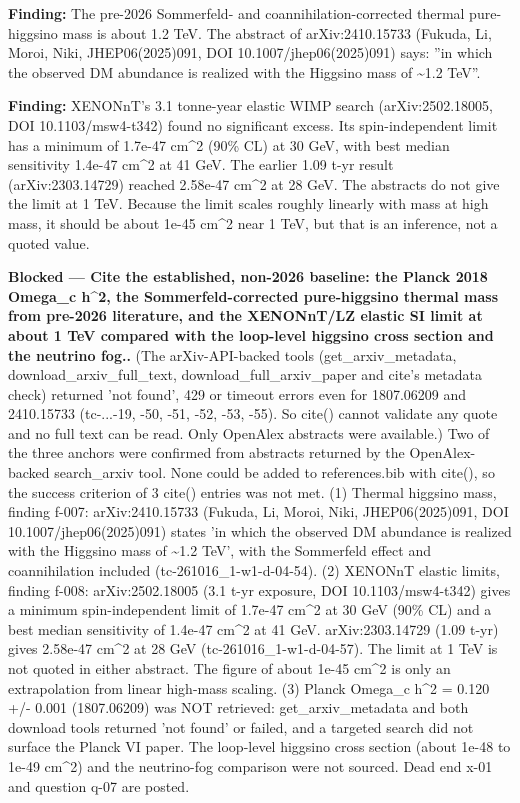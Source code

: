 \documentclass[11pt,a4paper]{article}
\begin{document}
\textbf{Finding:} The pre-2026 Sommerfeld- and coannihilation-corrected thermal pure-higgsino mass is about 1.2 TeV. The abstract of arXiv:2410.15733 (Fukuda, Li, Moroi, Niki, JHEP06(2025)091, DOI 10.1007/jhep06(2025)091) says: ''in which the observed DM abundance is realized with the Higgsino mass of \textasciitilde{}1.2 TeV''.

\textbf{Finding:} XENONnT's 3.1 tonne-year elastic WIMP search (arXiv:2502.18005, DOI 10.1103/msw4-t342) found no significant excess. Its spin-independent limit has a minimum of 1.7e-47 cm\textasciicircum{}2 (90\% CL) at 30 GeV, with best median sensitivity 1.4e-47 cm\textasciicircum{}2 at 41 GeV. The earlier 1.09 t-yr result (arXiv:2303.14729) reached 2.58e-47 cm\textasciicircum{}2 at 28 GeV. The abstracts do not give the limit at 1 TeV. Because the limit scales roughly linearly with mass at high mass, it should be about 1e-45 cm\textasciicircum{}2 near 1 TeV, but that is an inference, not a quoted value.

\textbf{Blocked --- Cite the established, non-2026 baseline: the Planck 2018 Omega\_c h\textasciicircum{}2, the Sommerfeld-corrected pure-higgsino thermal mass from pre-2026 literature, and the XENONnT/LZ elastic SI limit at about 1 TeV compared with the loop-level higgsino cross section and the neutrino fog..} (The arXiv-API-backed tools (get\_arxiv\_metadata, download\_arxiv\_full\_text, download\_full\_arxiv\_paper and cite's metadata check) returned 'not found', 429 or timeout errors even for 1807.06209 and 2410.15733 (tc-...-19, -50, -51, -52, -53, -55). So cite() cannot validate any quote and no full text can be read. Only OpenAlex abstracts were available.) Two of the three anchors were confirmed from abstracts returned by the OpenAlex-backed search\_arxiv tool. None could be added to references.bib with cite(), so the success criterion of 3 cite() entries was not met. (1) Thermal higgsino mass, finding f-007: arXiv:2410.15733 (Fukuda, Li, Moroi, Niki, JHEP06(2025)091, DOI 10.1007/jhep06(2025)091) states 'in which the observed DM abundance is realized with the Higgsino mass of \textasciitilde{}1.2 TeV', with the Sommerfeld effect and coannihilation included (tc-261016\_1-w1-d-04-54). (2) XENONnT elastic limits, finding f-008: arXiv:2502.18005 (3.1 t-yr exposure, DOI 10.1103/msw4-t342) gives a minimum spin-independent limit of 1.7e-47 cm\textasciicircum{}2 at 30 GeV (90\% CL) and a best median sensitivity of 1.4e-47 cm\textasciicircum{}2 at 41 GeV. arXiv:2303.14729 (1.09 t-yr) gives 2.58e-47 cm\textasciicircum{}2 at 28 GeV (tc-261016\_1-w1-d-04-57). The limit at 1 TeV is not quoted in either abstract. The figure of about 1e-45 cm\textasciicircum{}2 is only an extrapolation from linear high-mass scaling. (3) Planck Omega\_c h\textasciicircum{}2 = 0.120 +/- 0.001 (1807.06209) was NOT retrieved: get\_arxiv\_metadata and both download tools returned 'not found' or failed, and a targeted search did not surface the Planck VI paper. The loop-level higgsino cross section (about 1e-48 to 1e-49 cm\textasciicircum{}2) and the neutrino-fog comparison were not sourced. Dead end x-01 and question q-07 are posted.
\end{document}
